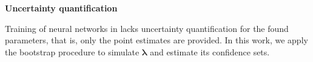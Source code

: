 \documentclass[a4paper, 12pt, parskip]{scrartcl}
\newcommand{\MSE}{\ensuremath{\text{MSE}}}
\renewcommand{\vec}[1]{\boldsymbol{#1}}
\newcommand{\VTheta}{\ensuremath{\vec{\theta}}}
\newcommand{\VLambda}{\ensuremath{\vec{\lambda}}}
\begin{document}

\textbf{Uncertainty quantification}

Training of neural networks in \cite{raissi2017pinnII} lacks uncertainty
quantification for the found parameters, that is, only the point estimates are
provided.
In this work, we apply the bootstrap procedure \cite{Wasserman2004} to simulate
$\VLambda$ and estimate its confidence sets.

\end{document}
